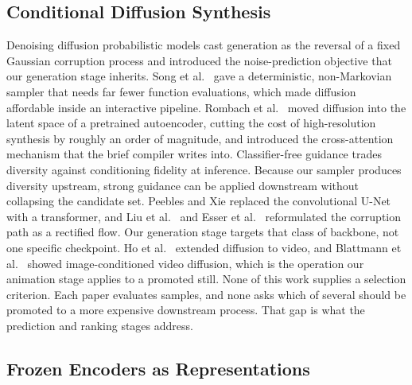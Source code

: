 \documentclass[conference]{IEEEtran}
\begin{document}
\subsection{Conditional Diffusion Synthesis}

Denoising diffusion probabilistic models \cite{ho2020ddpm} cast generation as the
reversal of a fixed Gaussian corruption process and introduced the noise-prediction
objective that our generation stage inherits. Song et al.\ \cite{song2021ddim} gave
a deterministic, non-Markovian sampler that needs far fewer function evaluations,
which made diffusion affordable inside an interactive pipeline. Rombach et al.\
\cite{rombach2022ldm} moved diffusion into the latent space of a pretrained
autoencoder, cutting the cost of high-resolution synthesis by roughly an order of
magnitude, and introduced the cross-attention mechanism that the brief compiler
writes into. Classifier-free guidance \cite{ho2022cfg} trades diversity against
conditioning fidelity at inference. Because our sampler produces diversity upstream,
strong guidance can be applied downstream without collapsing the candidate set.
Peebles and Xie \cite{peebles2023dit} replaced the convolutional U-Net with a
transformer, and Liu et al.\ \cite{liu2023rectflow} and Esser et al.\
\cite{esser2024sd3} reformulated the corruption path as a rectified flow. Our
generation stage targets that class of backbone, not one specific checkpoint. Ho et
al.\ \cite{ho2022vdm} extended diffusion to video, and Blattmann et al.\
\cite{blattmann2023svd} showed image-conditioned video diffusion, which is the
operation our animation stage applies to a promoted still. None of this work
supplies a selection criterion. Each paper evaluates samples, and none asks which of
several should be promoted to a more expensive downstream process. That gap is what
the prediction and ranking stages address.

\subsection{Frozen Encoders as Representations}
\end{document}
